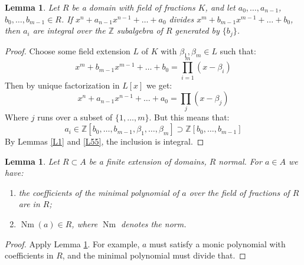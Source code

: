 \documentclass{article}
\newcommand{\Z}{\mathbb{Z}}
\DeclareMathOperator{\Nm}{Nm}
\theoremstyle{plain}
\newtheorem{lem}[thm]{Lemma}
\theoremstyle{definition}
\theoremstyle{remark}
\begin{document}
\begin{lem}
\label{L60}
Let $R$ be a domain with field of fractions $K$, and let $a_0, \dots, a_{n-1}$, $b_0, \dots, b_{m-1} \in R$. If $x^n + a_{n-1} x^{n-1} + \dots + a_0$ divides $x^m + b_{m-1} x^{m-1} + \dots + b_0$, then $a_i$ are integral over the $\Z$ subalgebra of $R$ generated by $\{b_j\}$.
\end{lem}
\begin{proof}
Choose some field extension $L$ of $K$ with $\beta_1, \beta_m \in L$ such that:
\[   x^m + b_{m-1}x^{m-1} + \dots + b_0 = \prod_{i=1}^m (x - \beta_i)  \]
Then by unique factorization in $L[x]$ we get:
\[     x^n + a_{n-1}x^{n-1} + \dots + a_0 = \prod_{j} (x - \beta_j)       \]
Where $j$ runs over a subset of $\{1, \dots, m\}$. But this means that:
\[     a_i \in \Z[b_0, \dots, b_{m-1} , \beta_1, \dots, \beta_m] \supset \Z[b_0, \dots, b_{m-1}]     \]
By Lemmas \ref{L1} and \ref{L55}, the inclusion is integral.
\end{proof}

\begin{lem}
\label{L61}
Let $R\subset A$ be a finite extension of domains, $R$ normal. For $a\in A$ we have:
\begin{enumerate} [(1)]
\item the coefficients of the minimal polynomial of $a$ over the field of fractions of $R$ are in $R$;
\item $\Nm (a) \in R$, where $\Nm$ denotes the norm.
\end{enumerate}
\end{lem}
\begin{proof}
Apply Lemma \ref{L60}. For example, $a$ must satisfy a monic polynomial with coefficients in $R$, and the minimal polynomial must divide that.
\end{proof}
\end{document}
